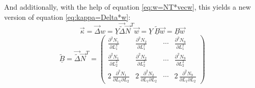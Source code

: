   And additionally, with the help of equation \ref{eq:w=NT*vecw}, this yields a new version of equation \ref{eq:kappa=Delta*w}:
  \begin{equation}\label{eq:kappa=YBw}
  \vec{\kappa} = \vec{\Delta} w = \underline{Y} \vec{\tilde{\Delta}} \vec{N}^T \vec{w} = \underline{Y}\:\underline{\tilde{B}} \vec{w} = \underline{B} \vec{w}
  \end{equation}
  \begin{equation}
  \underline{\tilde{B}} = \vec{\tilde{\Delta}} \vec{N}^T = \begin{pmatrix}
  \frac{\partial^2 N_1}{\partial L_1^2} & \frac{\partial^2 N_2}{\partial L_1^2} & \cdots & \frac{\partial^2 N_9}{\partial L_1^2}\\
  \frac{\partial^2 N_1}{\partial L_2^2} & \frac{\partial^2 N_2}{\partial L_2^2} & \cdots & \frac{\partial^2 N_9}{\partial L_2^2}\\
  2\,\frac{\partial^2 N_1}{\partial L_1 \partial L_2} & 2\,\frac{\partial^2 N_2}{\partial L_1 \partial L_2} & \cdots & 2\,\frac{\partial^2 N_9}{\partial L_1 \partial L_2}
  \end{pmatrix}
  \end{equation}
  
